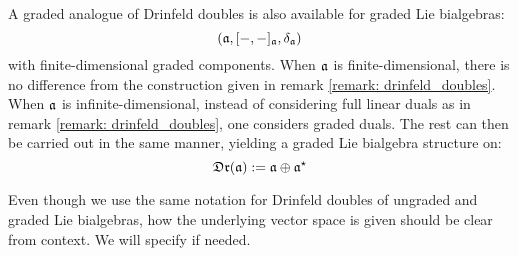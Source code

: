         \begin{remark} \label{remark: graded_drinfeld_doubles}
            A graded analogue of Drinfeld doubles is also available for graded Lie bialgebras:
                $$(\mathfrak{a}, [-, -]_{\mathfrak{a}}, \delta_{\mathfrak{a}})$$
            with finite-dimensional graded components. When $\mathfrak{a}$ is finite-dimensional, there is no difference from the construction given in remark \ref{remark: drinfeld_doubles}. When $\mathfrak{a}$ is infinite-dimensional, instead of considering full linear duals as in remark \ref{remark: drinfeld_doubles}, one considers graded duals. The rest can then be carried out in the same manner, yielding a graded Lie bialgebra structure on:
                $$\mathfrak{Dr}(\mathfrak{a}) := \mathfrak{a} \oplus \mathfrak{a}^{\star}$$
        \end{remark}
        Even though we use the same notation for Drinfeld doubles of ungraded and graded Lie bialgebras, how the underlying vector space is given should be clear from context. We will specify if needed.
        
